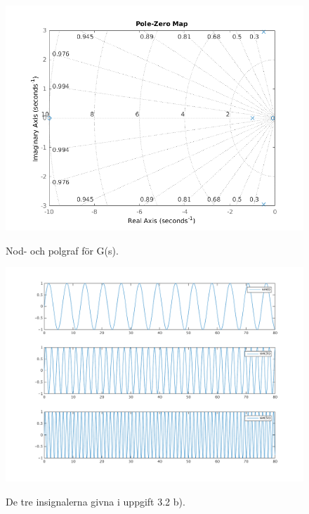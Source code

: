 \begin{figure}
    \caption{Nod- och polgraf för G(s).}
    \centering
    \includegraphics[scale=0.8]{figures/task2a-pzmap.png}
    \label{fig:task2a-pzmap}
\end{figure}

\begin{figure}
    \caption{De tre insignalerna givna i uppgift 3.2 b).}
    \centering
    \includegraphics[scale=0.55]{figures/task2b.png}
    \label{fig:task2b}
\end{figure}

